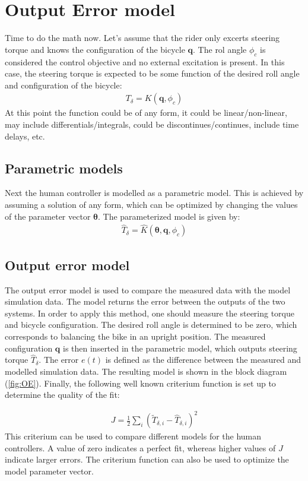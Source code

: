 \section{Output Error model}
Time to do the math now. Let's assume that the rider only excerts steering torque and knows the configuration of the bicycle $\mathbf{q}$. The rol angle $\phi_c$ is considered the control objective and no external excitation is present. In this case, the steering torque is expected to be some function of the desired roll angle and configuration of the bicycle:
		\begin{align}
		T_\delta = {K}(\mathbf{q},\phi_c)
		\end{align}
At this point the function could be of any form, it could be linear/non-linear,  may include differentials/integrals, could be discontinues/continues, include time delays, etc. %
%
\subsection{Parametric models}
Next the human controller is modelled as a parametric model. This is achieved by assuming a solution of any form, which can be optimized by changing the values of the parameter vector $\boldsymbol{\theta}$. The parameterized model is given by:
		\begin{align}
		\hat{T}_\delta = \hat{K}(\boldsymbol{\theta},\mathbf{q},\phi_c)
		\end{align}
\subsection{Output error model}
The output error model is used to compare the measured data with the model simulation data. The model returns the error between the outputs of the two systems. In order to apply this method, one should measure the steering torque and bicycle configuration. The desired roll angle is determined to be zero, which corresponds to balancing the bike in an upright position. The measured configuration $\mathbf{q}$ is then inserted in the parametric model, which outputs steering torque $\hat{T}_\delta$. The error $e(t)$ is defined as the difference between the measured and modelled simulation data. The resulting model is shown in the block diagram (\ref{fig:OE}). Finally, the following well known criterium function is set up to determine the quality of the fit:
    
		\begin{align}
		J = \frac{1}{2}\sum_i\left(\tilde{T}_{\delta,i} - \hat{T}_{\delta,i} \right)^2
		\end{align}
This criterium can be used to compare different models for the human controllers. A value of zero indicates a perfect fit, whereas higher values of $J$ indicate larger errors. The criterium function can also be used to optimize the model parameter vector.


